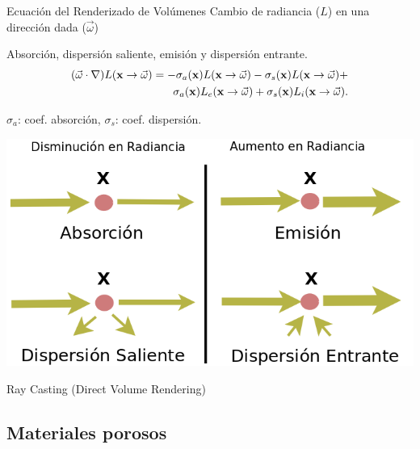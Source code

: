 \documentclass[spanish,unknownkeysallowed]{beamer}
\begin{document}
\begin{frame}{Ecuación del Renderizado de Volúmenes}
Cambio de radiancia ($L$) en una dirección dada ($\vec{\omega}$) 

Absorción, dispersión saliente, emisión y dispersión entrante.
\begin{equation*}
\begin{aligned}
(\vec{\omega} \cdot \nabla) L(\bold{x} \rightarrow \vec{\omega}) = - \sigma_{a}(\bold{x}) L(\bold{x} \rightarrow \vec{\omega}) - \sigma_{s}(\bold{x}) L(\bold{x} \rightarrow \vec{\omega}) + \\
\sigma_{a}(\bold{x}) L_{e}(\bold{x} \rightarrow \vec{\omega}) + \sigma_{s}(\bold{x}) L_{i}(\bold{x} \rightarrow \vec{\omega}).
\end{aligned}
\end{equation*}

$\sigma_{a}$: coef. absorción, $\sigma_{s}$: coef. dispersión.


\centering
\includegraphics[scale = 0.3]{../figures/fenomenosrte}

Ray Casting (Direct Volume Rendering)
\end{frame}



\subsection{Materiales porosos}
\end{document}
